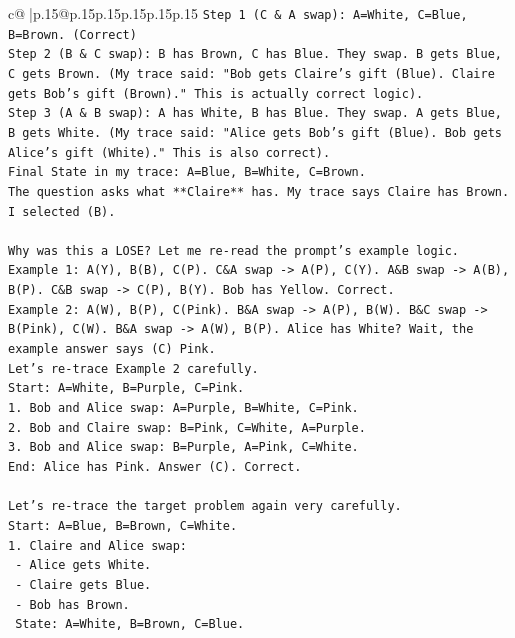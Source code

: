 \documentclass{article}
\begin{document}
{\begin{supertabular}{c@{$\;$}|p{.15\linewidth}@{}p{.15\linewidth}p{.15\linewidth}p{.15\linewidth}p{.15\linewidth}p{.15\linewidth}}
{{{\texttt{Step 1 (C \& A swap): A=White, C=Blue, B=Brown. (Correct)} \\
\texttt{Step 2 (B \& C swap): B has Brown, C has Blue. They swap. B gets Blue, C gets Brown. (My trace said: "Bob gets Claire's gift (Blue). Claire gets Bob's gift (Brown)." This is actually correct logic).} \\
\texttt{Step 3 (A \& B swap): A has White, B has Blue. They swap. A gets Blue, B gets White. (My trace said: "Alice gets Bob's gift (Blue). Bob gets Alice's gift (White)." This is also correct).} \\
\texttt{Final State in my trace: A=Blue, B=White, C=Brown.} \\
\texttt{The question asks what **Claire** has. My trace says Claire has Brown. I selected (B).} \\
\\ 
\texttt{Why was this a LOSE? Let me re{-}read the prompt's example logic.} \\
\texttt{Example 1: A(Y), B(B), C(P). C\&A swap {-}> A(P), C(Y). A\&B swap {-}> A(B), B(P). C\&B swap {-}> C(P), B(Y). Bob has Yellow. Correct.} \\
\texttt{Example 2: A(W), B(P), C(Pink). B\&A swap {-}> A(P), B(W). B\&C swap {-}> B(Pink), C(W). B\&A swap {-}> A(W), B(P). Alice has White? Wait, the example answer says (C) Pink.} \\
\texttt{Let's re{-}trace Example 2 carefully.} \\
\texttt{Start: A=White, B=Purple, C=Pink.} \\
\texttt{1. Bob and Alice swap: A=Purple, B=White, C=Pink.} \\
\texttt{2. Bob and Claire swap: B=Pink, C=White, A=Purple.} \\
\texttt{3. Bob and Alice swap: B=Purple, A=Pink, C=White.} \\
\texttt{End: Alice has Pink. Answer (C). Correct.} \\
\\ 
\texttt{Let's re{-}trace the target problem again very carefully.} \\
\texttt{Start: A=Blue, B=Brown, C=White.} \\
\texttt{1. Claire and Alice swap:} \\
\texttt{   {-} Alice gets White.} \\
\texttt{   {-} Claire gets Blue.} \\
\texttt{   {-} Bob has Brown.} \\
\texttt{   State: A=White, B=Brown, C=Blue.} \\
}}}
\end{supertabular}}
\end{document}
